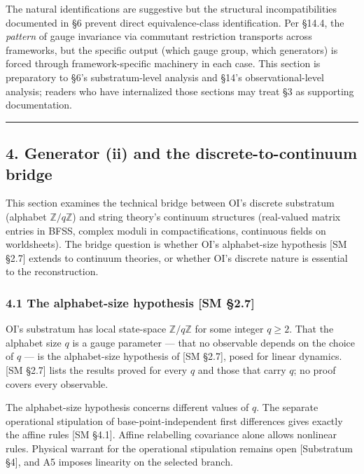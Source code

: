 \documentclass[
]{article}
\begin{document}
The natural identifications are suggestive but the structural
incompatibilities documented in §6 prevent direct equivalence-class
identification. Per §14.4, the \emph{pattern} of gauge invariance via
commutant restriction transports across frameworks, but the specific
output (which gauge group, which generators) is forced through
framework-specific machinery in each case. This section is preparatory
to §6's substratum-level analysis and §14's observational-level
analysis; readers who have internalized those sections may treat §3 as
supporting documentation.

\begin{center}\rule{0.5\linewidth}{0.5pt}\end{center}

\hypertarget{generator-ii-and-the-discrete-to-continuum-bridge}{%
\subsection{4. Generator (ii) and the discrete-to-continuum
bridge}\label{generator-ii-and-the-discrete-to-continuum-bridge}}

This section examines the technical bridge between OI's discrete
substratum (alphabet \(\mathbb{Z}/q\mathbb{Z}\)) and string theory's
continuum structures (real-valued matrix entries in BFSS, complex moduli
in compactifications, continuous fields on worldsheets). The bridge
question is whether OI's alphabet-size hypothesis {[}SM §2.7{]} extends
to continuum theories, or whether OI's discrete nature is essential to
the reconstruction.

\hypertarget{the-alphabet-size-hypothesis-sm-2.7}{%
\subsubsection{4.1 The alphabet-size hypothesis {[}SM
§2.7{]}}\label{the-alphabet-size-hypothesis-sm-2.7}}

OI's substratum has local state-space \(\mathbb{Z}/q\mathbb{Z}\) for
some integer \(q \geq 2\). That the alphabet size \(q\) is a gauge
parameter --- that no observable depends on the choice of \(q\) --- is
the alphabet-size hypothesis of {[}SM §2.7{]}, posed for linear
dynamics. {[}SM §2.7{]} lists the results proved for every \(q\) and
those that carry \(q\); no proof covers every observable.

The alphabet-size hypothesis concerns different values of \(q\). The
separate operational stipulation of base-point-independent first
differences gives exactly the affine rules {[}SM §4.1{]}. Affine
relabelling covariance alone allows nonlinear rules. Physical warrant
for the operational stipulation remains open {[}Substratum §4{]}, and A5
imposes linearity on the selected branch.
\end{document}
